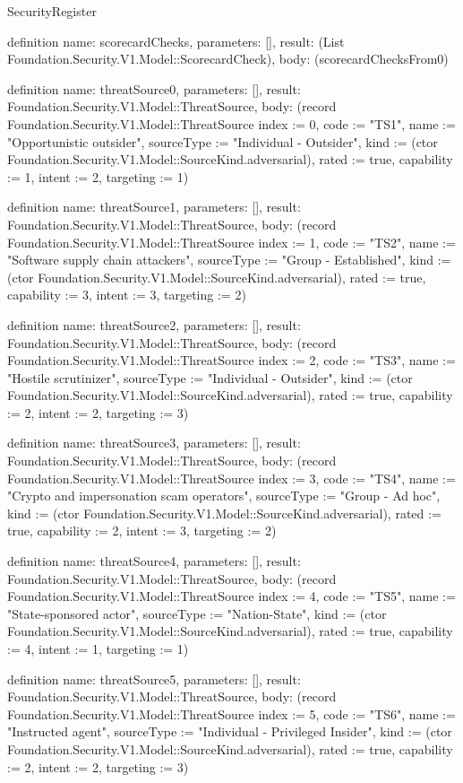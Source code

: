 \begin{lexlean}{SecurityRegister}
\begin{semanticmodule}
definition{
  name: scorecardChecks,
  parameters: [],
  result: (List Foundation.Security.V1.Model::ScorecardCheck),
  body: (scorecardChecksFrom0)
}

definition{
  name: threatSource0,
  parameters: [],
  result: Foundation.Security.V1.Model::ThreatSource,
  body: (record Foundation.Security.V1.Model::ThreatSource {index := 0, code := "TS1", name := "Opportunistic outsider", sourceType := "Individual - Outsider", kind := (ctor Foundation.Security.V1.Model::SourceKind.adversarial), rated := true, capability := 1, intent := 2, targeting := 1})
}

definition{
  name: threatSource1,
  parameters: [],
  result: Foundation.Security.V1.Model::ThreatSource,
  body: (record Foundation.Security.V1.Model::ThreatSource {index := 1, code := "TS2", name := "Software supply chain attackers", sourceType := "Group - Established", kind := (ctor Foundation.Security.V1.Model::SourceKind.adversarial), rated := true, capability := 3, intent := 3, targeting := 2})
}

definition{
  name: threatSource2,
  parameters: [],
  result: Foundation.Security.V1.Model::ThreatSource,
  body: (record Foundation.Security.V1.Model::ThreatSource {index := 2, code := "TS3", name := "Hostile scrutinizer", sourceType := "Individual - Outsider", kind := (ctor Foundation.Security.V1.Model::SourceKind.adversarial), rated := true, capability := 2, intent := 2, targeting := 3})
}

definition{
  name: threatSource3,
  parameters: [],
  result: Foundation.Security.V1.Model::ThreatSource,
  body: (record Foundation.Security.V1.Model::ThreatSource {index := 3, code := "TS4", name := "Crypto and impersonation scam operators", sourceType := "Group - Ad hoc", kind := (ctor Foundation.Security.V1.Model::SourceKind.adversarial), rated := true, capability := 2, intent := 3, targeting := 2})
}

definition{
  name: threatSource4,
  parameters: [],
  result: Foundation.Security.V1.Model::ThreatSource,
  body: (record Foundation.Security.V1.Model::ThreatSource {index := 4, code := "TS5", name := "State-sponsored actor", sourceType := "Nation-State", kind := (ctor Foundation.Security.V1.Model::SourceKind.adversarial), rated := true, capability := 4, intent := 1, targeting := 1})
}

definition{
  name: threatSource5,
  parameters: [],
  result: Foundation.Security.V1.Model::ThreatSource,
  body: (record Foundation.Security.V1.Model::ThreatSource {index := 5, code := "TS6", name := "Instructed agent", sourceType := "Individual - Privileged Insider", kind := (ctor Foundation.Security.V1.Model::SourceKind.adversarial), rated := true, capability := 2, intent := 2, targeting := 3})
}


\end{semanticmodule}
\end{lexlean}
